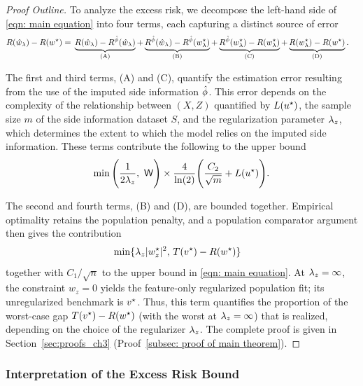 \begin{proof}[Proof Outline]
To analyze the excess risk, we decompose the left-hand side of \eqref{eqn: main equation} into four terms, each capturing a distinct source of error
\begin{equation*}
\begin{aligned}
    R(\hat{w}_\lambda) - R(w^\star) =\;&
    \underbrace{R(\hat{w}_\lambda) - R^{\hat{\phi}}(\hat{w}_\lambda)}_{\mathrm{(A)}} +
    \underbrace{R^{\hat{\phi}}(\hat{w}_\lambda) - R^{\hat{\phi}}(w^\star_{\lambda})}_{\mathrm{(B)}} + \underbrace{R^{\hat{\phi}}(w^\star_{\lambda}) - R(w^\star_{\lambda})}_{\mathrm{(C)}} +
    \underbrace{R(w^\star_{\lambda}) - R(w^\star)}_{\mathrm{(D)}}.
\end{aligned}
\end{equation*}

\noindent The first and third terms, (A) and (C), quantify the estimation error resulting from the use of the imputed side information $\hat{\phi}$. This error depends on the complexity of the relationship between $(X, Z)$ quantified by $L(u^\star)$, the sample size $m$ of the side information dataset $S$, and the regularization parameter $\lambda_z$, which determines the extent to which the model relies on the imputed side information. These terms contribute the following to the
upper bound
\begin{equation*}
    \min\Bigg( \frac{1}{2\lambda_z},\ \mathsf{W} \Bigg)
    \times
    \frac{4}{\ln(2)}\Bigg( \frac{C_2}{\sqrt{m}} + L(u^\star) \Bigg).
\end{equation*}

\noindent The second and fourth terms, (B) and (D), are bounded together.
Empirical optimality retains the population penalty, and a population
comparator argument then gives the contribution
\begin{equation*}
\begin{aligned}
    &\min\{\lambda_z |w^\star_z|^2,\, T(v^\star)-R(w^\star)\}
\end{aligned}
\end{equation*}
together with $C_1/\sqrt n$ to the upper bound in \eqref{eqn: main equation}.
At $\lambda_z=\infty$, the constraint $w_z=0$ yields the feature-only regularized population fit; its unregularized benchmark is $v^\star$. Thus, this term quantifies the proportion of the worst-case gap $T(v^\star) - R(w^\star)$ (with the worst at $\lambda_z = \infty$) that is realized, depending on the choice of the regularizer $\lambda_z$.
The complete proof is given in Section~\ref{sec:proofs_ch3} (Proof~\ref{subsec: proof of main theorem}).
\end{proof}

\subsubsection{Interpretation of the Excess Risk Bound}

